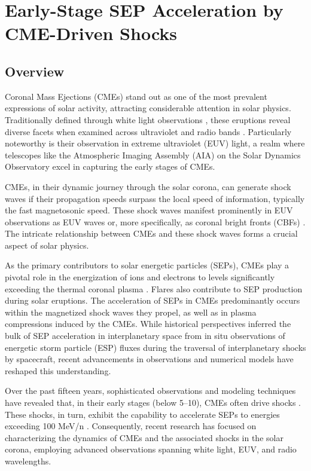 \section{Early-Stage SEP Acceleration by CME-Driven Shocks}
\subsection{Overview}
Coronal Mass Ejections (CMEs) stand out as one of the most prevalent expressions of solar activity, attracting considerable attention in solar physics. Traditionally defined through white light observations \citep{vourlidas_2003, zhang_2006, bein_2011}, these eruptions reveal diverse facets when examined across ultraviolet and radio bands \citep{bastian_2001, veronig_2010}. Particularly noteworthy is their observation in extreme ultraviolet (EUV) light, a realm where telescopes like the Atmospheric Imaging Assembly (AIA) on the Solar Dynamics Observatory \citep{lemen_2012, pesnell_2012} excel in capturing the early stages of CMEs.

CMEs, in their dynamic journey through the solar corona, can generate shock waves if their propagation speeds surpass the local speed of information, typically the fast magnetosonic speed. These shock waves manifest prominently in EUV observations as EUV waves or, more specifically, as coronal bright fronts (CBFs) \citep{thompson_1998, long_2011}. The intricate relationship between CMEs and these shock waves forms a crucial aspect of solar physics.

As the primary contributors to solar energetic particles (SEPs), CMEs play a pivotal role in the energization of ions and electrons to levels significantly exceeding the thermal coronal plasma \citep{reames_1999}. Flares also contribute to SEP production during solar eruptions. The acceleration of SEPs in CMEs predominantly occurs within the magnetized shock waves they propel, as well as in plasma compressions induced by the CMEs. While historical perspectives inferred the bulk of SEP acceleration in interplanetary space from in situ observations of energetic storm particle (ESP) fluxes during the traversal of interplanetary shocks by spacecraft, recent advancements in observations and numerical models have reshaped this understanding.

Over the past fifteen years, sophisticated observations and modeling techniques have revealed that, in their early stages (below 5–10\rsun), CMEs often drive shocks \citep{ontiveross_2009, gopalswamy_2011}. These shocks, in turn, exhibit the capability to accelerate SEPs to energies exceeding 100 MeV/n \citep{battarbee_2013, kozarev_2013, schwadron_2014, kong_2017}. Consequently, recent research has focused on characterizing the dynamics of CMEs and the associated shocks in the solar corona, employing advanced observations spanning white light, EUV, and radio wavelengths.

